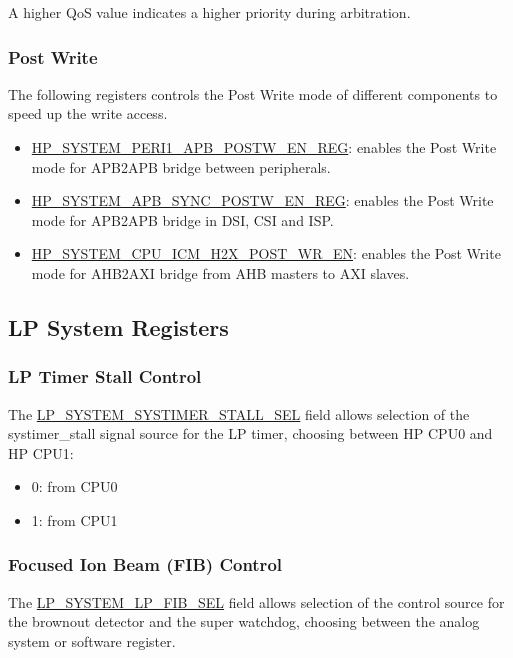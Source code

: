 \documentclass[main\_\_EN.tex]{subfiles}
\begin{document}
A higher QoS value indicates a higher priority during arbitration.

\subsubsection{Post Write}

The following registers controls the Post Write mode of different components to speed up the write access.
\begin{itemize}
    \item \hyperref[regdesc:HPSYSTEMPERI1APBPOSTWENREG]{HP\_SYSTEM\_PERI1\_APB\_POSTW\_EN\_REG}: enables the Post Write mode for APB2APB bridge between peripherals.
    \item \hyperref[regdesc:HPSYSTEMAPBSYNCPOSTWENREG]{HP\_SYSTEM\_APB\_SYNC\_POSTW\_EN\_REG}: enables the Post Write mode for APB2APB bridge in DSI, CSI and ISP.
    \item \hyperref[fielddesc:HPSYSTEMCPUICMH2XPOSTWREN]{HP\_SYSTEM\_CPU\_ICM\_H2X\_POST\_WR\_EN}: enables the Post Write mode for AHB2AXI bridge from AHB masters to AXI slaves.
\end{itemize}


\newpage
\subsection{LP System Registers}

\subsubsection{LP Timer Stall Control}

The \hyperref[fielddesc:LPSYSTEMSYSTIMERSTALLSEL]{LP\_SYSTEM\_SYSTIMER\_STALL\_SEL} field allows selection of the systimer\_stall signal source for the LP timer, choosing between HP CPU0 and HP CPU1:

\begin{itemize}
    \item 0: from CPU0
    \item 1: from CPU1
\end{itemize}

\subsubsection{Focused Ion Beam (FIB) Control}

The \hyperref[fielddesc:LPSYSTEMLPFIBSEL]{LP\_SYSTEM\_LP\_FIB\_SEL} field allows selection of the control source for the brownout detector and the super watchdog, choosing between the analog system or software register.
\end{document}
